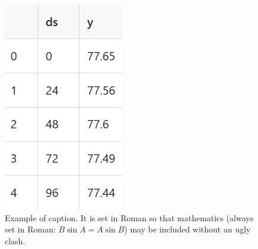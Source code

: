 \begin{figure}[H]
  \centering
     \includegraphics[width=\linewidth]{sec/No.4data.png} %

   \caption{Example of caption.
   It is set in Roman so that mathematics (always set in Roman: $B \sin A = A \sin B$) may be included without an ugly clash.}
   \label{fig:onecol}
\end{figure}

